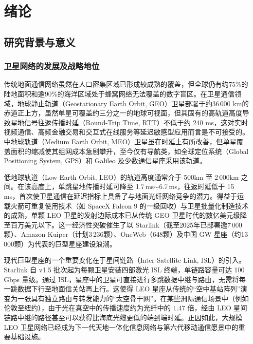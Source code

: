 \chapter{绪论}

\section{研究背景与意义}

\subsection{卫星网络的发展及战略地位}

传统地面通信网络虽然在人口密集区域已形成较成熟的覆盖，但全球仍有约75\%的陆地面积和逾90\%的海洋区域处于蜂窝网络无法覆盖的数字盲区。在卫星通信领域，地球静止轨道（Geostationary Earth Orbit, GEO）卫星部署于约36\,000 km的赤道正上方，虽然单星可覆盖约三分之一的地球可视面，但其固有的高轨道高度导致星地信号往返传播时延（Round-Trip Time, RTT）不低于约 240 ms，这对实时视频通信、高频金融交易和交互式在线服务等延迟敏感型应用而言是不可接受的。中地球轨道（Medium Earth Orbit, MEO）卫星虽在时延上有所改善，但单星覆盖面积的缩减使其组网成本急剧攀升，至今仅有导航类，如全球定位系统（Global Positioning System, GPS）和 Galileo 及少数通信星座采用该轨道。

低地球轨道（Low Earth Orbit, LEO）的轨道高度通常介于 500km 至 2\,000km 之间。在该高度上，单跳星地传播时延可降至 1.7\,ms$\sim$6.7\,ms，往返时延低于 15\,ms，首次使卫星通信在延迟指标上具备了与地面光纤网络竞争的潜力。得益于运载火箭可重复使用技术（如 SpaceX Falcon 9 的一级回收）与卫星批量化制造技术的成熟，单颗 LEO 卫星的发射边际成本已从传统 GEO 卫星时代的数亿美元级降至百万美元以下。这一经济性突破催生了以 Starlink（截至2025年已部署逾7\,000颗）、Amazon Kuiper（计划3\,236颗）、OneWeb（648颗）及中国 GW 星座（约13\,000颗）为代表的巨型星座建设浪潮。

现代巨型星座的一个重要变化在于星间链路（Inter-Satellite Link, ISL）的引入。Starlink 自 v1.5 批次起为每颗卫星安装四部激光 ISL 终端，单链路容量可达 100\,Gbps 量级。通过 ISL，星座中的卫星可直接进行多跳数据中继与路由，无需将每一跳数据下行至地面信关站再上行。这使得 LEO 星座从传统的“空中基站阵列”演变为一张具有独立路由与转发能力的“太空骨干网”。在某些洲际通信场景中（例如伦敦至纽约），由于光在真空中的传播速度约为光纤中的 $1.47$ 倍，经由 LEO 星间链路中继的路径甚至可以获得比海底光缆更低的端到端时延。正因如此，大规模 LEO 卫星网络已经成为下一代天地一体化信息网络与第六代移动通信愿景中的重要基础设施。

